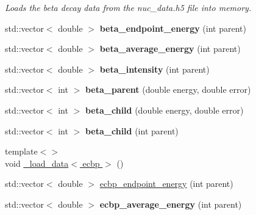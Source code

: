 \begin{DoxyCompactItemize}
\begin{DoxyCompactList}\small\item\em Loads the beta decay data from the nuc\+\_\+data.\+h5 file into memory. \end{DoxyCompactList}\item 
\hypertarget{namespacepyne_a1b55f98ecca83a9191eb30ee9ce6592b}{std\+::vector$<$ double $>$ {\bfseries beta\+\_\+endpoint\+\_\+energy} (int parent)}\label{namespacepyne_a1b55f98ecca83a9191eb30ee9ce6592b}

\item 
\hypertarget{namespacepyne_ab385d0c04c1da2033bdf0e8309a293cb}{std\+::vector$<$ double $>$ {\bfseries beta\+\_\+average\+\_\+energy} (int parent)}\label{namespacepyne_ab385d0c04c1da2033bdf0e8309a293cb}

\item 
\hypertarget{namespacepyne_a818e4cda17d0e3746e7c39c452505f03}{std\+::vector$<$ double $>$ {\bfseries beta\+\_\+intensity} (int parent)}\label{namespacepyne_a818e4cda17d0e3746e7c39c452505f03}

\item 
\hypertarget{namespacepyne_a4f6a73d374babad7eae37b1a5ede31b1}{std\+::vector$<$ int $>$ {\bfseries beta\+\_\+parent} (double energy, double error)}\label{namespacepyne_a4f6a73d374babad7eae37b1a5ede31b1}

\item 
\hypertarget{namespacepyne_a06a66d50d789c15eb06403145c9e8f78}{std\+::vector$<$ int $>$ {\bfseries beta\+\_\+child} (double energy, double error)}\label{namespacepyne_a06a66d50d789c15eb06403145c9e8f78}

\item 
\hypertarget{namespacepyne_aecf3b1f9104cd326141aaabf6dc1dd85}{std\+::vector$<$ int $>$ {\bfseries beta\+\_\+child} (int parent)}\label{namespacepyne_aecf3b1f9104cd326141aaabf6dc1dd85}

\item 
{\footnotesize template$<$$>$ }\\void \hyperlink{namespacepyne_aa0e5344b00be282952a8da5cc928b387}{\+\_\+load\+\_\+data$<$ ecbp $>$} ()
\item 
std\+::vector$<$ double $>$ \hyperlink{namespacepyne_a01290076b747cd8f6fb8785d698d9319}{ecbp\+\_\+endpoint\+\_\+energy} (int parent)
\item 
\hypertarget{namespacepyne_aae965f50671162fd430ecc100a6734c3}{std\+::vector$<$ double $>$ {\bfseries ecbp\+\_\+average\+\_\+energy} (int parent)}\label{namespacepyne_aae965f50671162fd430ecc100a6734c3}


\end{DoxyCompactItemize}
